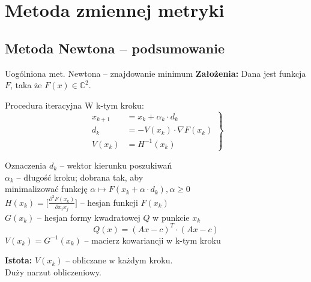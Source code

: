 \section{Metoda zmiennej metryki}

\subsection{Metoda Newtona -- podsumowanie}
  \begin{frame}
    \begin{block}{Uogólniona met. Newtona -- znajdowanie minimum}
      \textbf{Założenia: } Dana jest funkcja $F$, taka że $F(x) \in \mathbb{C}^2$.
    \end{block}
    \begin{block}{Procedura iteracyjna}
      W k-tym kroku:
      \begin{equation}\label{eq:def_0}
        \left.
          \begin{aligned}
            x_{k + 1} &= x_{k} + \alpha_{k} \cdot d_{k}\\
            d_{k}     &= - V(x_k) \cdot \nabla F(x_{k})\\
            V(x_k)    &= H^{-1}(x_{k})
          \end{aligned}
       \right\}
      \end{equation}
    \end{block}
  \end{frame}

  \begin{frame}{}
    \begin{block}{Oznaczenia}
      $d_{k}$ -- wektor kierunku poszukiwań\\
      $\alpha_{k}$ -- długość kroku; dobrana tak, aby\\
      \hspace*{8mm} minimalizować funkcję $\alpha \mapsto F(x_{k} + \alpha \cdot d_{k}), \alpha \geq 0$\\
      $H(x_k) = \bigg[ \frac{\partial^2 F(x_{k})}{\partial x_{i} x_{j}} \bigg]$ -- hesjan funkcji $F(x_{k})$\\
      $G(x_k)$ -- hesjan formy kwadratowej $Q$ w punkcie $x_k$\\
      \begin{equation*}
        Q(x) = (Ax - c)^T \cdot (Ax - c)
      \end{equation*}
      $V(x_k) = G^{-1}(x_k)$ -- macierz kowariancji w k-tym kroku
    \end{block}

    \begin{block}{}
      \textbf{Istota: } $V(x_{k})$ -- obliczane w każdym kroku.\\
      Duży narzut obliczeniowy.
    \end{block}
  \end{frame}

